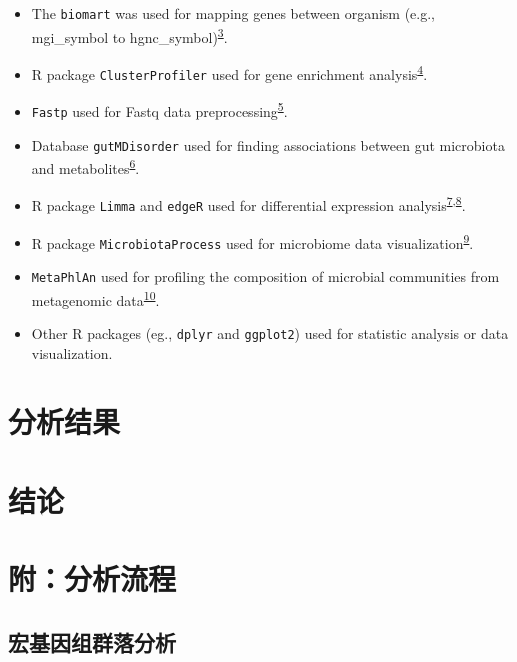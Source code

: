 \documentclass[
]{article}
\providecommand{\tightlist}{%
  \setlength{\itemsep}{0pt}\setlength{\parskip}{0pt}}
\begin{document}
\begin{itemize}
\tightlist
\item
  The \texttt{biomart} was used for mapping genes between organism (e.g., mgi\_symbol to hgnc\_symbol)\textsuperscript{\protect\hyperlink{ref-MappingIdentifDurinc2009}{3}}.
\item
  R package \texttt{ClusterProfiler} used for gene enrichment analysis\textsuperscript{\protect\hyperlink{ref-ClusterprofilerWuTi2021}{4}}.
\item
  \texttt{Fastp} used for Fastq data preprocessing\textsuperscript{\protect\hyperlink{ref-UltrafastOnePChen2023}{5}}.
\item
  Database \texttt{gutMDisorder} used for finding associations between gut microbiota and metabolites\textsuperscript{\protect\hyperlink{ref-GutmdisorderACheng2019}{6}}.
\item
  R package \texttt{Limma} and \texttt{edgeR} used for differential expression analysis\textsuperscript{\protect\hyperlink{ref-LimmaPowersDiRitchi2015}{7},\protect\hyperlink{ref-EdgerDifferenChen}{8}}.
\item
  R package \texttt{MicrobiotaProcess} used for microbiome data visualization\textsuperscript{\protect\hyperlink{ref-MicrobiotaproceXuSh2023}{9}}.
\item
  \texttt{MetaPhlAn} used for profiling the composition of microbial communities from metagenomic data\textsuperscript{\protect\hyperlink{ref-ExtendingAndIBlanco2023}{10}}.
\item
  Other R packages (eg., \texttt{dplyr} and \texttt{ggplot2}) used for statistic analysis or data visualization.
\end{itemize}

\hypertarget{results}{%
\section{分析结果}\label{results}}

\hypertarget{dis}{%
\section{结论}\label{dis}}

\hypertarget{workflow}{%
\section{附：分析流程}\label{workflow}}

\hypertarget{ux5b8fux57faux56e0ux7ec4ux7fa4ux843dux5206ux6790}{%
\subsection{宏基因组群落分析}\label{ux5b8fux57faux56e0ux7ec4ux7fa4ux843dux5206ux6790}}
\end{document}
